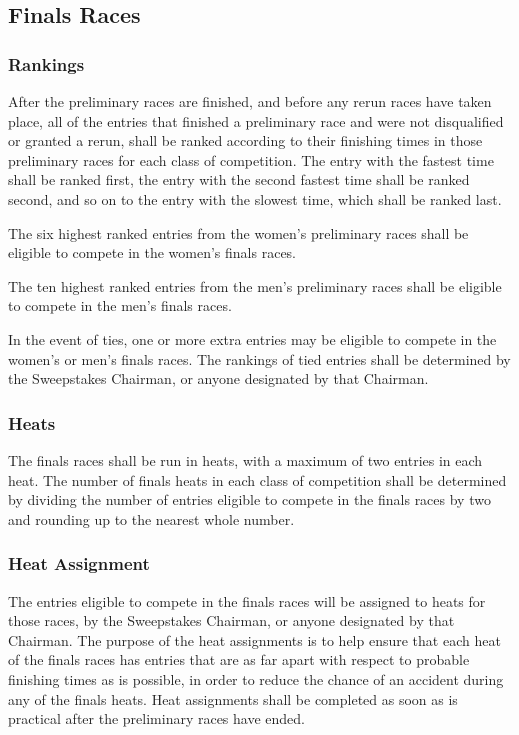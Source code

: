 \documentclass[openany]{book}
\begin{document}
\subsection{Finals Races}

\subsubsection{Rankings}

After the preliminary races are finished, and before any rerun races have taken place, all of the entries that finished a preliminary race and were not disqualified or granted a rerun, shall be ranked according to their finishing times in those preliminary races for each class of competition. The entry with the fastest time shall be ranked first, the entry with the second fastest time shall be ranked second, and so on to the entry with the slowest time, which shall be ranked last.

The six highest ranked entries from the women's preliminary races shall be eligible to compete in the women's finals races.

The ten highest ranked entries from the men's preliminary races shall be eligible to compete in the men's finals races.

In the event of ties, one or more extra entries may be eligible to compete in the women's or men's finals races. The rankings of tied entries shall be determined by the Sweepstakes Chairman, or anyone designated by that Chairman.

\subsubsection{Heats}

The finals races shall be run in heats, with a maximum of two entries in each heat. The number of finals heats in each class of competition shall be determined by dividing the number of entries eligible to compete in the finals races by two and rounding up to the nearest whole number.

\subsubsection{Heat Assignment}

The entries eligible to compete in the finals races will be assigned to heats for those races, by the Sweepstakes Chairman, or anyone designated by that Chairman. The purpose of the heat assignments is to help ensure that each heat of the finals races has entries that are as far apart with respect to probable finishing times as is possible, in order to reduce the chance of an accident during any of the finals heats. Heat assignments shall be completed as soon as is practical after the preliminary races have ended.
\end{document}
